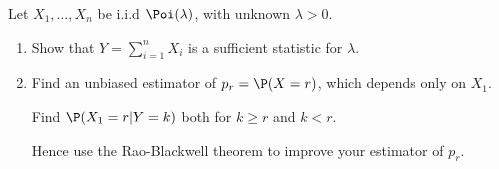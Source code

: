 
\begin{exercise}

Let $X_1,\dots,X_n$ be i.i.d $\Poi(\lambda)$, with unknown $\lambda > 0$.

\begin{enumerate}[label = (\alph*)]
    \item Show that $Y = \sum_{i=1}^n X_i$ is a sufficient statistic for $\lambda$.
    \item Find an unbiased estimator of $p_r = \P(X = r)$, which depends only
    on $X_1$.

    Find $\P(X_1 = r | Y = k)$ both for $k \geq r$ and $k < r$.

    Hence use the Rao-Blackwell theorem to improve your estimator of $p_r$.
\end{enumerate}

\end{exercise}


